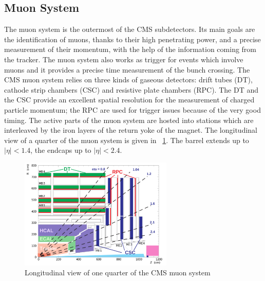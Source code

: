\subsection{Muon System}
The muon system is the outermost of the CMS subdetectors. Its main goals are the identification of muons, thanks to their high penetrating power, and a precise measurement of their momentum, with the help of the information coming from the tracker. The muon system also works as trigger for events which involve muons and it provides a precise time measurement of the bunch crossing. The CMS muon system \cite{muonDetector} relies on three kinds of gaseous detectors: drift tubes (DT), cathode strip chambers (CSC) and resistive plate chambers (RPC). The DT and the CSC provide an excellent spatial resolution for the measurement of charged particle momentum; the RPC are used for trigger issues because of the very good timing. The active parts of the muon system are hosted into stations which are interleaved by the iron layers of the return yoke of the magnet. The longitudinal view of a quarter of the muon system is given in \figurename~\ref{fig:muon}. The barrel extends up to $|\eta|<1.4$, the endcaps up to $|\eta|<2.4$. 
\begin{figure}[h!]
 \centering
 \includegraphics[width=0.65\textwidth]{Images/muonsyst.pdf}
 \caption{Longitudinal view of one quarter of the CMS muon system}
\label{fig:muon}
\end{figure}

